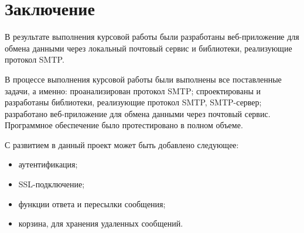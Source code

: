 \chapter*{Заключение}

В результате выполнения курсовой работы были разработаны веб-приложение для обмена данными через локальный почтовый сервис и библиотеки, реализующие протокол SMTP.

В процессе выполнения курсовой работы были выполнены все поставленные задачи, а именно: проанализирован протокол SMTP; спроектированы и разработаны библиотеки, реализующие протокол SMTP, SMTP-сервер; разработано веб-приложение для обмена данными через почтовый сервис. Программное обеспечение было протестировано в полном объеме.

С развитием в данный проект может быть добавлено следующее:
\begin{itemize}
	\item аутентификация;
	\item SSL-подключение;
	\item функции ответа и пересылки сообщения;
	\item корзина, для хранения удаленных сообщений.
\end{itemize}